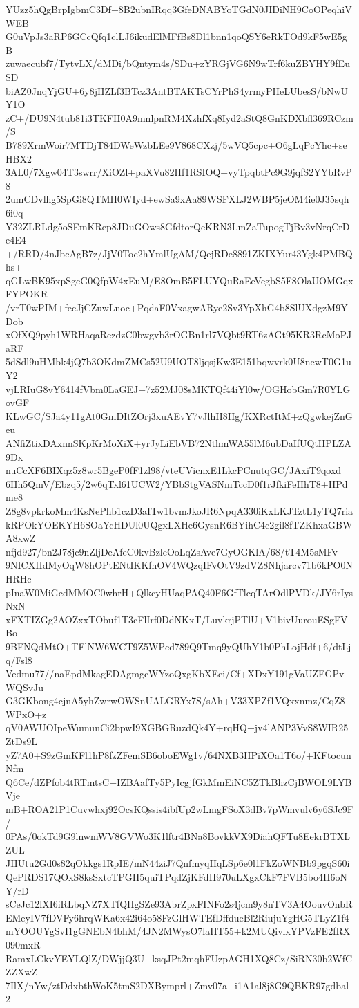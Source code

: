 YUzz5hQgBrpIgbmC3Df+8B2ubnIRqq3GfeDNABYoTGdN0JIDiNH9CoOPeqhiVWEB
G0uVpJs3aRP6GCcQfq1clLJ6ikudElMFfBs8Dl1bnn1qoQSY6eRkTOd9kF5wE5gB
zuwaecubf7/TytvLX/dMDi/bQntym4s/SDu+zYRGjVG6N9wTrf6kuZBYHY9fEuSD
biAZ0JnqYjGU+6y8jHZLf3BTcz3AntBTAKTsCYrPhS4yrmyPHeLUbesS/bNwUY1O
zC+/DU9N4tub81i3TKFH0A9mnlpnRM4XzhfXq8Iyd2aStQ8GnKDXbfl369RCzm/S
B789XrmWoir7MTDjT84DWeWzbLEe9V868CXzj/5wVQ5cpc+O6gLqPcYhc+seHBX2
3AL0/7Xgw04T3swrr/XiOZl+paXVu82Hf1RSIOQ+vyTpqbtPc9G9jqfS2YYbRvP8
2umCDvlhg5SpGi8QTMH0WIyd+ewSa9xAa89WSFXLJ2WBP5jeOM4ie0J35sqh6i0q
Y32ZLRLdg5oSEmKRep8JDuGOws8GfdtorQeKRN3LmZaTupogTjBv3vNrqCrDe4E4
+/RRD/4nJbcAgB7z/JjV0Toc2hYmlUgAM/QejRDe8891ZKIXYur43Ygk4PMBQhs+
qGLwBK95xpSgcG0QfpW4xEuM/E8OmB5FLUYQuRaEeVegbS5F8OlaUOMGqxFYPOKR
/vrT0wPIM+fecJjCZuwLnoc+PqdaF0VxagwARye2Sv3YpXhG4b8SlUXdgzM9YDob
xOfXQ9pyh1WRHaqaRezdzC0bwgvb3rOGBn1rl7VQbt9RT6zAGt95KR3RcMoPJaRF
5dSdl9uHMbk4jQ7b3OKdmZMCs52U9UOT8ljqsjKw3E151bqwvrk0U8newT0G1uY2
vjLRIuG8vY6414fVbm0LaGEJ+7z52MJ08sMKTQf44iYl0w/OGHobGm7R0YLGovGF
KLwGC/SJa4y11gAt0GmDItZOrj3xuAEvY7vJlhH8Hg/KXRctItM+zQgwkejZnGeu
ANfiZtixDAxnnSKpKrMoXiX+yrJyLiEbVB72NthmWA55lM6ubDaIfUQtHPLZA9Dx
nuCcXF6BIXqz5z8wr5BgeP0fF1zl98/vteUVicnxE1LkcPCnutqGC/JAxiT9qoxd
6Hh5QmV/Ebzq5/2w6qTxl61UCW2/YBbStgVASNmTccD0f1rJfkiFeHhT8+HPdme8
Z8g8vpkrkoMm4KsNePhb1czD3aITw1bvmJkoJR6NpqA330iKxLKJTztL1yTQ7ria
kRPOkYOEKYH6SOaYcHDUl0UQgxLXHe6GysnR6BYihC4c2gil8fTZKhxaGBWA8xwZ
nfjd927/bn2J78jc9nZljDeAfeC0kvBzleOoLqZsAve7GyOGKlA/68/tT4M5sMFv
9NICXHdMyOqW8hOPtENtIKKfnOV4WQzqIFvOtV9zdVZ8Nhjarcv71b6kPO0NHRHc
pInaW0MiGcdMMOC0whrH+QlkcyHUaqPAQ40F6GfTlcqTArOdlPVDk/JY6rIysNxN
xFXTIZGg2AOZxxTObuf1T3cFlIrf0DdNKxT/LuvkrjPTlU+V1bivUurouESgFVBo
9BFNQdMtO+TFlNW6WCT9Z5WPcd789Q9Tmq9yQUhY1b0PhLojHdf+6/dtLjq/Fsl8
Vedmu77//naEpdMkagEDAgmgcWYzoQxgKbXEei/Cf+XDxY191gVaUZEGPvWQSvJu
G3GKbong4cjnA5yhZwrwOWSnUALGRYx7S/sAh+V33XPZf1VQxxnmz/CqZ8WPxO+z
qV0AWUOIpeWumunCi2bpwI9XGBGRuzdQk4Y+rqHQ+jv4lANP3VvS8WIR25ZtDs9L
yZ7A0+S9zGmKFl1hP8fzZFemSB6oboEWg1v/64NXB3HPiXOa1T6o/+KFtocunNfm
Q6Ce/dZPfob4tRTmtsC+IZBAafTy5PyIcgjfGkMmEiNC5ZTkBhzCjBWOL9LYBVje
mB+ROA21P1Cuvwhxj92OcsKQssis4ibfUp2wLmgFSoX3dBv7pWmvulv6y6SJc9F/
0PAs/0okTd9G9lnwmWV8GVWo3K1lftr4BNa8BovkkVX9DiahQFTu8EekrBTXLZUL
JHUtu2Gd0s82qOkkgs1RpIE/mN44ziJ7QnfmyqHqLSp6e0l1FkZoWNBb9pgqS60i
QePRDS17QOxS8ksSxtcTPGH5quiTPqdZjKFdH970uLXgxCkF7FVB5bo4H6oNY/rD
sCeJc12lXI6iRLbqNZ7XTfQHgSZe93AbrZpxFINFo2s4jcm9y8nTV3A4OouvOnbR
EMeyIV7fDVFy6hrqWKa6x42i64o58FzGlHWTEfDffdueBl2RiujuYgHG5TLyZ1f4
mYOOUYgSvI1gGNEbN4bhM/4JN2MWysO7laHT55+k2MUQivlxYPVzFE2fRX090mxR
RamxLCkvYEYLQlZ/DWjjQ3U+ksqJPt2mqhFUzpAGH1XQ8Cz/SiRN30b2WfCZZXwZ
7IlX/nYw/ztDdxbthWoK5tmS2DXBymprl+Zmv07a+i1A1al8j8G9QBKR97gdbal2
